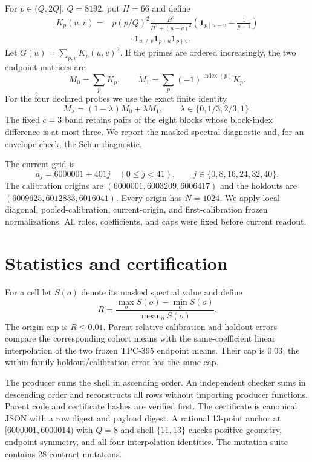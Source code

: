\documentclass[10pt]{article}
\begin{document}
For $p\in(Q,2Q]$, $Q=8192$, put $H=66$ and define
\begin{align*}
 K_p(u,v)={}&p(p/Q)^2\frac{H^2}{H^2+(u-v)^2}
 \left(\mathbf 1_{p\mid u-v}-\frac{1}{p-1}\right)\\
 &\qquad\cdot\mathbf 1_{u\ne v}\mathbf 1_{p\nmid u}\mathbf 1_{p\nmid v}.
\end{align*}
Let $G(u)=\sum_{p,v}K_p(u,v)^2$.  If the primes are ordered increasingly,
the two endpoint matrices are
\[
 M_0=\sum_pK_p,\qquad
 M_1=\sum_p(-1)^{\operatorname{index}(p)}K_p.
\]
For the four declared probes we use the exact finite identity
\[
 M_\lambda=(1-\lambda)M_0+\lambda M_1,
 \qquad \lambda\in\{0,1/3,2/3,1\}.
\]
The fixed $c=3$ band retains pairs of the eight blocks whose block-index
difference is at most three.  We report the masked spectral diagnostic and,
for an envelope check, the Schur diagnostic.

The current grid is
\[
 a_j=6000001+401j\quad(0\leq j<41),
 \qquad j\in\{0,8,16,24,32,40\}.
\]
The calibration origins are $(6000001,6003209,6006417)$ and the holdouts are
$(6009625,6012833,6016041)$.  Every origin has $N=1024$.  We apply local
diagonal, pooled-calibration, current-origin, and first-calibration frozen
normalizations.  All roles, coefficients, and caps were fixed before current
readout.

\section{Statistics and certification}

For a cell let $S(o)$ denote its masked spectral value and define
\[
 R=\frac{\max_oS(o)-\min_oS(o)}{\operatorname{mean}_oS(o)}.
\]
The origin cap is $R\leq0.01$.  Parent-relative calibration and holdout
errors compare the corresponding cohort means with the same-coefficient linear
interpolation of the two frozen TPC-395 endpoint means.  Their cap is $0.03$;
the within-family holdout/calibration error has the same cap.

The producer sums the shell in ascending order.  An independent checker sums
in descending order and reconstructs all rows without importing producer
functions.  Parent code and certificate hashes are verified first.  The
certificate is canonical JSON with a row digest and payload digest.  A rational
13-point anchor at $[6000001,6000014)$ with $Q=8$ and shell $\{11,13\}$ checks
positive geometry, endpoint symmetry, and all four interpolation identities.
The mutation suite contains 28 contract mutations.
\end{document}
